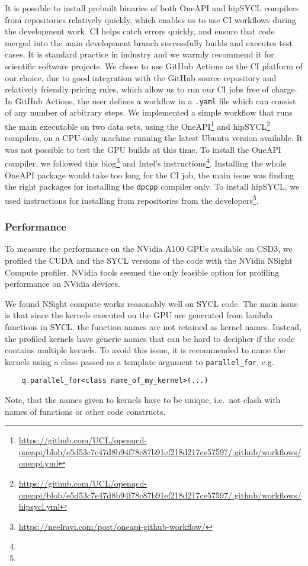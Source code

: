 \documentclass[../main]{subfiles}
\begin{document}
It is possible to install prebuilt binaries of both OneAPI and hipSYCL compilers from repositories relatively quickly, which enables us to use CI workflows during the development work.
CI helps catch errors quickly, and ensure that code merged into the main development branch successfully builds and executes test cases.
It is standard practice in industry and we warmly recommend it for scientific software projects.
We chose to use GitHub Actions as the CI platform of our choice, due to good integration with the GitHub source repository and relatively friendly pricing rules, which allow us to run our CI jobs free of charge.
In GitHub Actions, the user defines a workflow in a \verb #.yaml# file which can consist of any number of arbitrary steps.
We implemented a simple workflow that runs the main executable on two data sets, using the OneAPI\footnote{\url{https://github.com/UCL/openqcd-oneapi/blob/e5d53c7e47d8b94f78c87b91ef218d217ce57597/.github/workflows/oneapi.yml}} and hipSYCL\footnote{\url{https://github.com/UCL/openqcd-oneapi/blob/e5d53c7e47d8b94f78c87b91ef218d217ce57597/.github/workflows/hipsycl.yml}} compilers, on a CPU-only machine running the latest Ubuntu version available.
It was not possible to test the GPU builds at this time.
To install the OneAPI compiler, we followed this blog\footnote{\url{https://neelravi.com/post/oneapi-github-workflow/}} and Intel's instructions\footnote{\oneapiaptinstall}.
Installing the whole OneAPI package would take too long for the CI job, the main issue was finding the right packages for installing the \verb #dpcpp# compiler only.
To install hipSYCL, we used instructions for installing from repositories from the developers\footnote{\hipsyclinstallfromrepos}.

\subsubsection{Performance}\label{sec:openqcd_performance}

To measure the performance on the NVidia A100 GPUs available on CSD3, we profiled the CUDA and the SYCL versions of the code with the NVidia NSight Compute profiler.
NVidia tools seemed the only feasible option for profiling performance on NVidia devices.

We found NSight compute works reasonably well on SYCL code.
The main issue is that since the kernels executed on the GPU are generated from lambda functions in SYCL, the function names are not retained as kernel names.
Instead, the profiled kernels have generic names that can be hard to decipher if the code contains multiple kernels.
To avoid this issue, it is recommended to name the kernels using a class passed as a template argument to \verb #parallel_for#, e.g.
\begin{verbatim}
    q.parallel_for<class name_of_my_kernel>(...)
\end{verbatim}
Note, that the names given to kernels have to be unique, i.e.\ not clash with names of functions or other code constructs.
\end{document}
